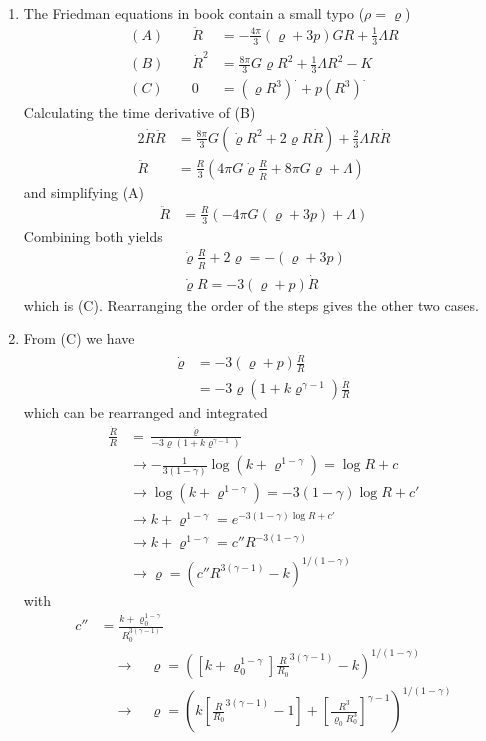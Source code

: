 \documentclass[10pt,a4paper]{article}
\theoremstyle{definition}
\begin{document}
\begin{enumerate}
\item The Friedman equations in book contain a small typo ($\rho=\varrho$)
\begin{align}
    (A)\qquad \ddot R&=-\frac{4\pi}{3}(\varrho+3p)GR+\frac{1}{3}\Lambda R\\
    (B)\qquad  \dot R^2&=\frac{8\pi}{3}G\varrho R^2+\frac{1}{3}\Lambda R^2-K\\
    (C)\qquad 0&=(\varrho R^3)^\cdot+p(R^3)^\cdot
\end{align}
Calculating the time derivative of (B)
\begin{align}
    2\dot{R}\ddot{R}&=\frac{8\pi}{3}G(\dot{\varrho}R^2+2\varrho R\dot{R})+\frac{2}{3}\Lambda R\dot{R}\\
    \ddot{R}&=\frac{R}{3}\left(4\pi G\dot\varrho \frac{R}{\dot{R}}+8\pi G\varrho +\Lambda\right)
\end{align}
and simplifying (A)
\begin{align}
    \ddot R&=\frac{R}{3}\left(-4\pi G(\varrho+3p)+\Lambda\right)
\end{align}
Combining both yields
\begin{align}
    \dot\varrho \frac{R}{\dot{R}}+2\varrho=-(\varrho+3p)\\
    \dot\varrho R=-3(\varrho+p)\dot{R}
\end{align}
which is (C). Rearranging the order of the steps gives the other two  cases.
\item From (C) we have
\begin{align}
    \dot\varrho &=-3(\varrho+p)\frac{\dot{R}}{R}\\
    &=-3\varrho\left(1+k\varrho^{\gamma-1}\right)\frac{\dot{R}}{R}
\end{align}
which can be rearranged and integrated
\begin{align}
    \frac{\dot{R}}{R}&=\frac{\dot\varrho}{-3\varrho\left(1+k\varrho^{\gamma-1}\right)}\\
    &\rightarrow-\frac{1}{3(1-\gamma)}\log(k+\varrho^{1-\gamma})=\log R+c\\
    &\rightarrow\log(k+\varrho^{1-\gamma})=-3(1-\gamma)\log R+c'\\
    &\rightarrow k+\varrho^{1-\gamma}=e^{-3(1-\gamma)\log R+c'}\\
    &\rightarrow k+\varrho^{1-\gamma}=c''R^{-3(1-\gamma)}\\
    &\rightarrow \varrho=\left(c''R^{3(\gamma-1)}-k\right)^{1/(1-\gamma)}
\end{align}
with
\begin{align}
    c''&=\frac{k+\varrho_0^{1-\gamma}}{R_0^{3(\gamma-1)}}\\
    &\quad\rightarrow\quad\varrho=\left([k+\varrho_0^{1-\gamma}]\frac{R}{R_0}^{3(\gamma-1)}-k\right)^{1/(1-\gamma)}\\
    &\quad\rightarrow\quad\varrho=\left(k\left[\frac{R}{R_0}^{3(\gamma-1)}-1\right]+\left[\frac{R^3}{\varrho_0R_0^3}\right]^{\gamma-1}\right)^{1/(1-\gamma)}
\end{align}


\end{enumerate}
\end{document}
